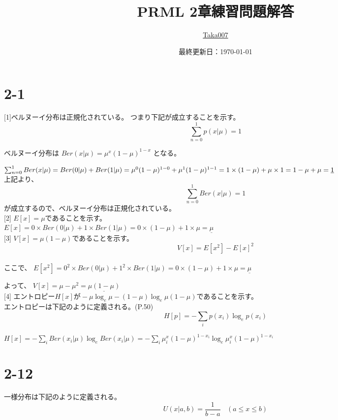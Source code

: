 \documentclass{ltjsarticle}
\title{PRML 2章練習問題解答}
\author{\href{https://github.com/Taka0007}{Taka007}}
\date{最終更新日：\today}
\begin{document}
\maketitle

\tableofcontents
\newpage

\section*{2-1}
[1]ベルヌーイ分布は正規化されている。
つまり下記が成立することを示す。
$$
\sum_{n=0}^1 p(x| \mu ) = 1
$$

ベルヌーイ分布は
$
Ber(x| \mu) = \mu^x (1-\mu)^{1-x}
$
となる。

$
\sum_{n=0}^1 Ber(x| \mu)
= Ber(0| \mu) + Ber(1| \mu)
= \mu^0 (1-\mu)^{1-0} + \mu^1 (1-\mu)^{1-1}
= 1 \times (1-\mu) + \mu \times 1 \\
= 1-\mu + \mu
= \underline{1}
$
\\
上記より、
$$
\sum_{n=0}^1 Ber(x| \mu) = 1
$$
が成立するので、ベルヌーイ分布は正規化されている。
\\

[2] $E[x] = \mu $であることを示す。\\
$
E[x] = 0 \times Ber(0| \mu) + 1 \times Ber(1| \mu)
= 0 \times (1-\mu) + 1 \times \mu
= \underline{\mu}
$
\\

[3] $V[x] = \mu (1-\mu)$であることを示す。\\
$$
V[x] = E[x^2] - E[x]^2
$$
\\
ここで、
$
E[x^2] = 0^2 \times Ber(0| \mu) + 1^2 \times Ber(1| \mu)
= 0 \times (1-\mu) + 1 \times \mu
= \underline{\mu}
$

よって、
$
V[x] = \mu - \mu^2
= \underline{\mu (1-\mu)}
$
\\

[4] エントロピー$H[x]が-\mu \log_e \mu - (1-\mu) \log_e \mu (1-\mu)$であることを示す。\\

エントロピーは下記のように定義される。(P.50)
$$
H[p] = - \sum_{i} p(x_i) \log_e p(x_i)
$$

$
H[x] = - \sum_{i} Ber(x_i| \mu) \log_e Ber(x_i| \mu)
= - \sum_{i} \mu^x_i (1-\mu)^{1-x_i} \log_e \mu^x_i (1-\mu)^{1-x_i}
$\\

\section*{2-12}
一様分布は下記のように定義される。 \\
$$
U(x|a,b) = \frac{1}{b-a} \ \ \ \ (a \leq x \leq b)
$$
\end{document}

